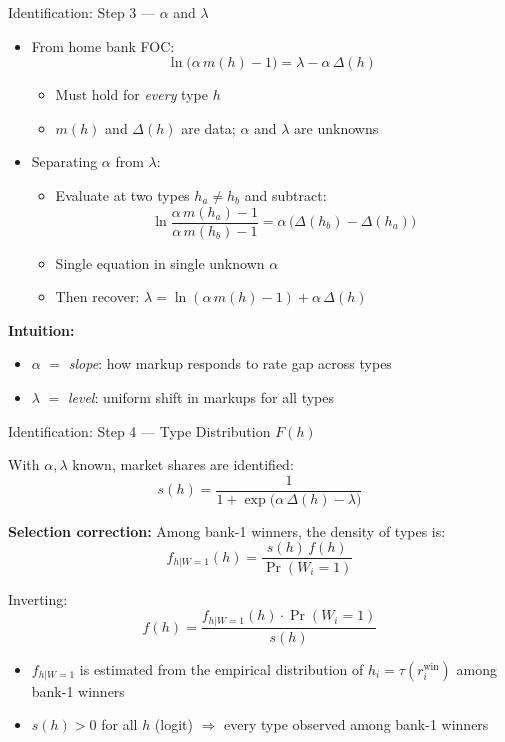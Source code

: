 \documentclass[10pt,aspectratio=169]{beamer}
\begin{document}
\begin{frame}{Identification: Step 3 --- $\alpha$ and $\lambda$}

\begin{itemize}
    \item From home bank FOC: 
    $$\ln\!\big(\alpha\, m(h) - 1\big) = \lambda - \alpha\, \Delta(h)$$
    \begin{itemize}
        \item Must hold for \emph{every} type $h$
        \item $m(h)$ and $\Delta(h)$ are data; $\alpha$ and $\lambda$ are unknowns
    \end{itemize}
    \item Separating $\alpha$ from $\lambda$:
\begin{itemize}
    \item Evaluate at two types $h_a \neq h_b$ and subtract:
    $$\ln\frac{\alpha\, m(h_a) - 1}{\alpha\, m(h_b) - 1} = \alpha\,\big(\Delta(h_b) - \Delta(h_a)\big)$$
    \item Single equation in single unknown $\alpha$ 
    \item Then recover: $\lambda = \ln(\alpha\, m(h) - 1) + \alpha\, \Delta(h)$
\end{itemize}
\end{itemize}

\vspace{0.2cm}
\textbf{Intuition:}
\begin{itemize}
    \item $\alpha$ $=$ \emph{slope}: how markup responds to rate gap across types
    \item $\lambda$ $=$ \emph{level}: uniform shift in markups for all types
\end{itemize}

\end{frame}


\begin{frame}{Identification: Step 4 --- Type Distribution $F(h)$}

With $\alpha, \lambda$ known, market shares are identified:
$$s(h) = \frac{1}{1 + \exp\!\big(\alpha\,\Delta(h) - \lambda\big)}$$

\textbf{Selection correction:} Among bank-1 winners, the density of types is:
$$f_{h|W=1}(h) = \frac{s(h)\, f(h)}{\Pr(W_i = 1)}$$

Inverting:
$$f(h) = \frac{f_{h|W=1}(h) \cdot \Pr(W_i = 1)}{s(h)}$$

\begin{itemize}
    \item $f_{h|W=1}$ is estimated from the empirical distribution of $h_i = \tau(r_i^{\text{win}})$ among bank-1 winners
    \item $s(h) > 0$ for all $h$ (logit) $\Rightarrow$ every type observed among bank-1 winners
\end{itemize}
\end{frame}
\end{document}
